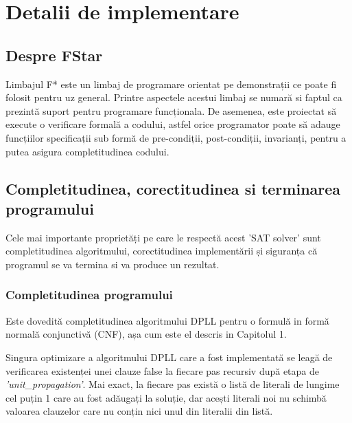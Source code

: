 \chapter{Detalii de implementare}


\section{Despre FStar}

Limbajul F* este un limbaj de programare orientat pe demonstrații ce poate fi \newline folosit pentru uz general. Printre aspectele acestui limbaj se numară si faptul ca \newline prezintă suport pentru programare funcționala. De asemenea, este proiectat să execute o verificare formală a codului, astfel orice programator poate să adauge funcțiilor \newline specificații sub formă de pre-condiții, post-condiții, invarianți, pentru a putea asigura completitudinea codului.

\section{Completitudinea, corectitudinea si  \newline terminarea programului}

Cele mai importante proprietăți pe care le respectă acest 'SAT solver' sunt \newline completitudinea algoritmului, corectitudinea implementării și siguranța că programul se va termina si va produce un rezultat.

\subsection{Completitudinea programului}

Este dovedită completitudinea algoritmului DPLL pentru o formulă in formă normală conjunctivă (CNF), așa cum este el descris in Capitolul 1.

Singura optimizare a algoritmului DPLL care a fost implementată se leagă de \newline verificarea existenței unei clauze false la fiecare pas recursiv după etapa de \textit{'unit\_propagation'}. \newpage Mai exact, la fiecare pas există o listă de literali de lungime cel puțin 1 care au fost \newline adăugați la soluție, dar acești literali noi nu schimbă valoarea clauzelor care nu conțin nici unul din literalii din listă.
 
